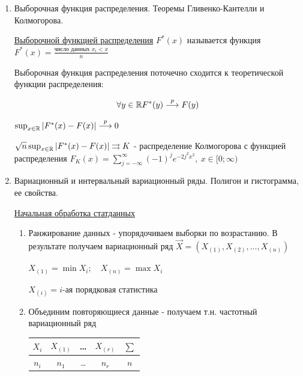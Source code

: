 \documentclass[12pt]{article}
\begin{document}
\begin{enumerate}
    \item Выборочная функция распределения. Теоремы Гливенко-Кантелли и Колмогорова.

    \Def \hyperlink{selective_distribution_function}{Выборочной функцией распределения} $F^*(x)$ называется функция $F^*(x) = \frac{\text{число данных } x_i < x}{n}$

    \begin{MyTheorem}
        \Ths Выборочная функция распределения поточечно сходится к теоретической функции распределения:

        \[\forall y \in \mathbb{R} F^*(y) \overset{p}{\longrightarrow} F(y)\]
    \end{MyTheorem}

    \begin{MyTheorem}
         $\sup_{x \in \mathbb{R}} |F^*(x) - F(x)| \overset{p}{\longrightarrow} 0$
    \end{MyTheorem}

    \begin{MyTheorem}
         $\sqrt{n} \sup_{x \in \mathbb{R}} |F^*(x) - F(x)| \rightrightarrows K$ - распределение Колмогорова с 
        функцией распределения $F_K(x) = \sum_{j = -\infty}^{\infty} (-1)^j e^{-2 j^2 x^2}, \ x \in [0;\infty)$
    \end{MyTheorem}

    \item Вариационный и интервальный вариационный ряды. Полигон и гистограмма, ее свойства.

        
    \hyperlink{initial_data_processing}{Начальная обработка статданных}

    \begin{enumerate}
        \item Ранжирование данных - упорядочиваем выборки по возрастанию. В результате получаем вариационный ряд $\vec{X} = (X_{(1)}, X_{(2)}, \dots, X_{(n)})$

        $X_{(1)} = \min X_i; \quad X_{(n)} = \max X_i$

        $X_{(i)} = i$-ая порядковая статистика

        \item Объединим повторяющиеся данные - получаем т.н. частотный вариационный ряд

        \begin{tabular}{c|c|c|c|c}
            $X_i$ & $X_{(1)}$ & \dots & $X_{(r)}$ & $\sum$ \\ 
            \hline
            $n_i$ & $n_1$ & \dots & $n_r$ & $n$ \\ 
        \end{tabular}


\end{enumerate}
\end{enumerate}
\end{document}
